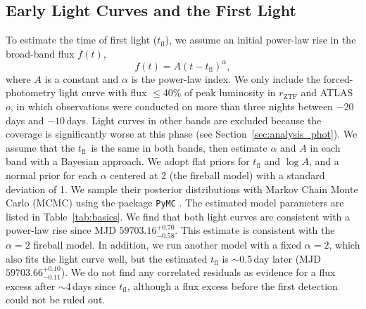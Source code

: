 \documentclass[twocolumn]{aastex631}
\newcommand{\tfl}{$t_\mathrm{fl}$}
\begin{document}
\begin{CJK*}{UTF8}{gbsn}
\subsection{Early Light Curves and the First Light}
To estimate the time of first light ($t_\mathrm{fl}$), we assume an initial power-law rise in the broad-band flux $f(t)$,
$$
f(t) = A (t-t_\mathrm{fl})^\alpha,
$$
where $A$ is a constant and $\alpha$ is the power-law index. We only include the forced-photometry light curve with flux $\le$40\% of peak luminosity \citep{Miller_ZTF_2020} in $r_\mathrm{ZTF}$ and ATLAS $o$, in which observations were conducted on more than three nights between $-20$\,days and $-10$\,days. Light curves in other bands are excluded because the coverage is significantly worse at this phase (see Section~\ref{sec:analysis_phot}). We assume that the \tfl\ is the same in both bands, then estimate $\alpha$ and $A$ in each band with a Bayesian approach. We adopt flat priors for $t_\mathrm{fl}$ and $\log A$, and a normal prior for each $\alpha$ centered at 2 (the fireball model) with a standard deviation of 1. We sample their posterior distributions with Markov Chain Monte Carlo (MCMC) using the package \texttt{PyMC} \citep{pymc_2016}. The estimated model parameters are listed in Table~\ref{tab:basics}. We find that both light curves are consistent with a power-law rise since MJD $59703.16^{+0.70}_{-0.58}$. %
This estimate is consistent with the $\alpha=2$ fireball model. In addition, we run another model with a fixed $\alpha=2$, which also fits the light curve well, but the estimated $t_\mathrm{fl}$ is $\sim$0.5\,day later (MJD $59703.66_{-0.11}^{+0.10}$). We do not find any correlated residuals as evidence for a flux excess after $\sim$4\,days since $t_\mathrm{fl}$, although a flux excess before the first detection could not be ruled out.



\end{CJK*}
\end{document}
